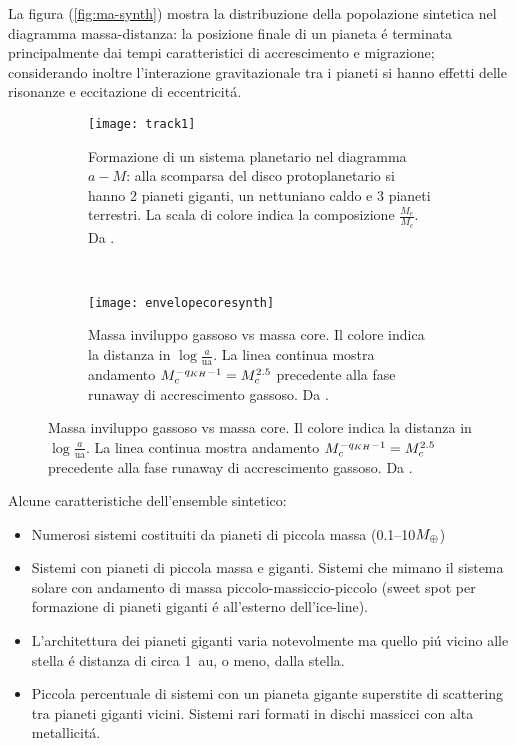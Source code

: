 La figura (\ref{fig:ma-synth}) mostra la distribuzione della popolazione sintetica nel diagramma massa-distanza: la posizione finale di un pianeta \'e terminata principalmente dai tempi caratteristici di accrescimento e migrazione; considerando inoltre l'interazione gravitazionale tra i pianeti si hanno effetti delle risonanze e eccitazione di eccentricit\'a.

\begin{figure}[!ht]
\begin{subfigure}[b]{0.47\textwidth}
\centering
\texttt{[image: track1]}
\caption{Formazione di un sistema planetario nel diagramma $a-M$: alla scomparsa del disco protoplanetario si hanno 2 pianeti giganti, un nettuniano caldo e 3 pianeti terrestri. La scala di colore indica la composizione $\frac{M_e}{M_c}$. Da \cite{mordasini2018planetary}.}\label{fig:track1}
\end{subfigure}
~
\begin{subfigure}[b]{0.47\textwidth}
\centering
\texttt{[image: envelopecoresynth]}
\caption{Massa inviluppo gassoso vs massa core. Il colore indica la distanza in $\log{\frac{a}{\si{\astronomicalunit}}}$. La linea continua mostra andamento $M_c^{-q_{KH}-1}=M_c^{2.5}$ precedente alla fase runaway di accrescimento gassoso. Da \cite{mordasini2018planetary}. }\label{fig:envelopecoresynth}
\end{subfigure}
\end{figure}

Alcune caratteristiche dell'ensemble sintetico: %
\begin{itemize}
\item Numerosi sistemi costituiti da pianeti di piccola massa (\numrange{0.1}{10}$M_{\oplus}{}$)
\item Sistemi con pianeti di piccola massa e giganti. Sistemi che mimano il sistema solare con andamento di massa piccolo-massiccio-piccolo (sweet spot per formazione di pianeti giganti \'e all'esterno dell'ice-line).
\item L'architettura dei pianeti giganti varia notevolmente ma quello pi\'u vicino alle stella \'e distanza di circa \SI{1}{\astronomicalunit}, o meno, dalla stella.
\item Piccola percentuale di sistemi con un pianeta gigante superstite di scattering tra pianeti giganti vicini. Sistemi rari formati in dischi massicci con alta metallicit\'a.
\end{itemize}

